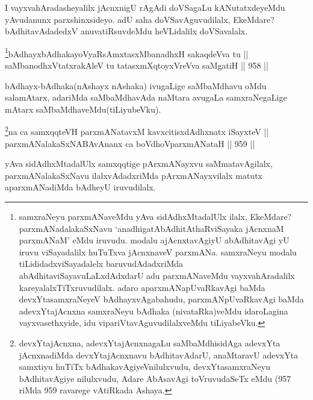 \begin{artha}
I vayxvahAradasheyalilx jAcnxnigU rAgAdi doVSagaLu kANutatxdeyeMdu yAvudanunx parxshinxsideyo. adU saha doVSavAguvudilalx, EkeMdare? bAdhitavAdadedxV anuvatiRsuvdeMdu heVLidalilx doVSavalalx.
\end{artha}



\begin{shl}
\footnote{samxraNeyu parxmANaveMdu yAva sidAdhxMtadalUlx ilalx, EkeMdare? parxmANadalakaSxNavu `anadhigatAbAdhitAthaRviSayaka jAcnxnaM parxmANaM' eMdu iruvudu. modalu ajAcnxtavAgiyU abAdhitavAgi yU iruvu viSayadalilx huTuTxva jAcnxnaveV parxmANa. samxraNeyu modalu tiLididadxviSayadalelx baruvudAdadxriMda abAdhitaviSayavuLaLxdAdxdarU adu parxmANaveMdu vayxvahAradalilx kareyalalxTiTxruvudilalx. adaro aparxmANapUvaRkavAgi baMda devxYtasamxraNeyeV bAdhayxvAgabahudu, parxmANpUvaRkavAgi baMda adevxYtajAcnxna samxraNeyu bAdhaka (nivataRka)veMdu idaroLagina vayxvasethxyide, idu vipariVtavAguvudilalxveMdu tiLiyabeVku.}bAdhayxbAdhakayoVyaRsAmxtasxMbanadhxH sakaqdeVva tu || \\
saMbanodhxVtatxrakAleV tu tatasxmXqtoyxVreVva saMgatiH \hfill || 958 ||  
\end{shl}

\begin{artha}
bAdhayx-bAdhaka(nAshayx nAshaka) ivugaLige saMbaMdhavu oMdu salamAtarx, adariMda saMbaMdhavAda naMtara avugaLa samxraNegaLige mAtarx saMbaMdhaveMdu(tiLiyubeVku).
\end{artha}



\begin{shl}
\footnote{devxYtajAcnxna, adevxYtajAcnxnagaLu saMbaMdhisidAga adevxYta jAcnxnadiMda devxYtajAcnxnavu bAdhitavAdarU, anaMtaravU adevxYta samxtiyu huTiTx bAdhakavAgiyeVnilulxvudu, devxYtasamxraNeyu bAdhitavAgiye nilulxvudu, Adare AbAsavAgi toVruvudaSeTx eMdu (957 riMda 959 ravarege vAtiRkada Ashaya.}na ca samxqqteVH parxmANatavxM kavxcitisxdAdhxnatx iSayxteV ||  \\
parxmANalakaSxNABAvAnanx ca boVdhoV\s parxmANataH \hfill || 959 ||  
\end{shl}

\begin{artha}
yAva sidAdhxMtadalUlx samxqqtige pArxmANayxvu saMmatavAgilalx, parxmANalakaSxNavu ilalxvAdadxriMda pArxmANayxvilalx matutx aparxmANadiMda bAdheyU iruvudilalx.
\end{artha}

